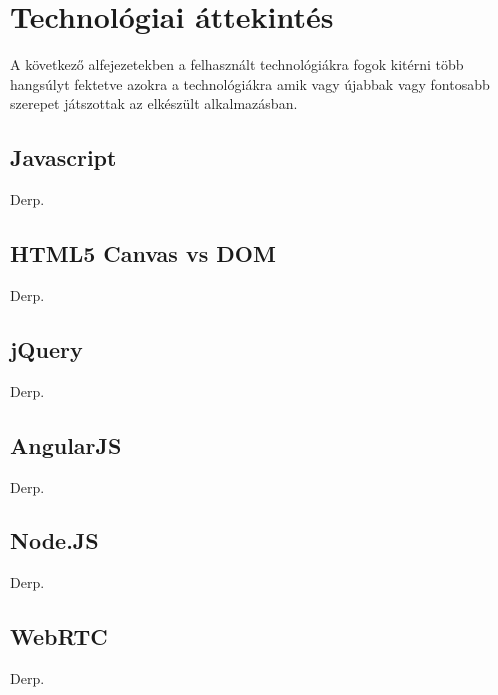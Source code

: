 



\chapter{Technológiai áttekintés}
A következő alfejezetekben a felhasznált technológiákra fogok kitérni több hangsúlyt fektetve azokra a technológiákra amik vagy újabbak vagy fontosabb szerepet játszottak az elkészült alkalmazásban.


\section{Javascript}
Derp.

\section{HTML5 Canvas vs DOM}
Derp.



\section{jQuery}
Derp.

\section{AngularJS}
Derp.%
\section{Node.JS}
Derp.%
\section{WebRTC}
Derp.


